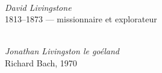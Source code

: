 \vspace*{\fill}
\begin{center}

  \begin{minipage}[b]{0.8\textwidth}
    \centering
    \\[0.3em]
    {\small\itshape David Livingstone}\\
    {\footnotesize 1813--1873 — missionnaire et explorateur}
  \end{minipage}

  \vspace{1.5em}

  \begin{minipage}[b]{0.8\textwidth}
    \centering
    \\[0.3em]
    {\small\itshape Jonathan Livingston le goéland}\\
    {\footnotesize Richard Bach, 1970}
  \end{minipage}

\end{center}
\vspace*{\fill}

